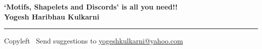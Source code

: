 
\graphicspath{{images/}}

\footnotesize


\begin{center}
\Large{\textbf{`Motifs, Shapelets and Discords' is all you need!!\\ Yogesh Haribhau Kulkarni}}  
\end{center}

\begin{multicols}{2}

\end{multicols}

\rule{\linewidth}{0.25pt}
\scriptsize
Copyleft \textcopyleft\  Send suggestions to 
\href{http://www.yogeshkulkarni.com}{yogeshkulkarni@yahoo.com}


